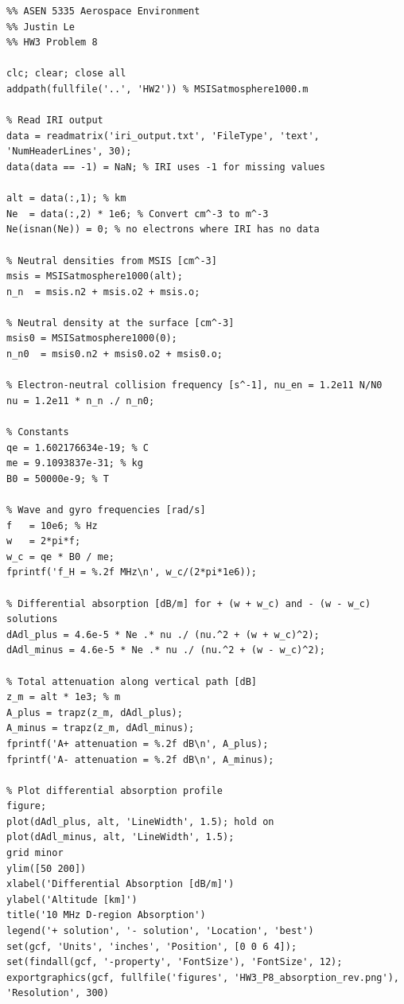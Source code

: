 \documentclass[11pt]{article}
\begin{document}
\newpage
\begin{lstlisting}
%% ASEN 5335 Aerospace Environment
%% Justin Le
%% HW3 Problem 8

clc; clear; close all
addpath(fullfile('..', 'HW2')) % MSISatmosphere1000.m

% Read IRI output
data = readmatrix('iri_output.txt', 'FileType', 'text', 'NumHeaderLines', 30);
data(data == -1) = NaN; % IRI uses -1 for missing values

alt = data(:,1); % km
Ne  = data(:,2) * 1e6; % Convert cm^-3 to m^-3
Ne(isnan(Ne)) = 0; % no electrons where IRI has no data

% Neutral densities from MSIS [cm^-3]
msis = MSISatmosphere1000(alt);
n_n  = msis.n2 + msis.o2 + msis.o;

% Neutral density at the surface [cm^-3]
msis0 = MSISatmosphere1000(0);
n_n0  = msis0.n2 + msis0.o2 + msis0.o;

% Electron-neutral collision frequency [s^-1], nu_en = 1.2e11 N/N0
nu = 1.2e11 * n_n ./ n_n0;

% Constants
qe = 1.602176634e-19; % C
me = 9.1093837e-31; % kg
B0 = 50000e-9; % T

% Wave and gyro frequencies [rad/s]
f   = 10e6; % Hz
w   = 2*pi*f;
w_c = qe * B0 / me;
fprintf('f_H = %.2f MHz\n', w_c/(2*pi*1e6));

% Differential absorption [dB/m] for + (w + w_c) and - (w - w_c) solutions
dAdl_plus = 4.6e-5 * Ne .* nu ./ (nu.^2 + (w + w_c)^2);
dAdl_minus = 4.6e-5 * Ne .* nu ./ (nu.^2 + (w - w_c)^2);

% Total attenuation along vertical path [dB]
z_m = alt * 1e3; % m
A_plus = trapz(z_m, dAdl_plus);
A_minus = trapz(z_m, dAdl_minus);
fprintf('A+ attenuation = %.2f dB\n', A_plus);
fprintf('A- attenuation = %.2f dB\n', A_minus);

% Plot differential absorption profile
figure;
plot(dAdl_plus, alt, 'LineWidth', 1.5); hold on
plot(dAdl_minus, alt, 'LineWidth', 1.5);
grid minor
ylim([50 200])
xlabel('Differential Absorption [dB/m]')
ylabel('Altitude [km]')
title('10 MHz D-region Absorption')
legend('+ solution', '- solution', 'Location', 'best')
set(gcf, 'Units', 'inches', 'Position', [0 0 6 4]);
set(findall(gcf, '-property', 'FontSize'), 'FontSize', 12);
exportgraphics(gcf, fullfile('figures', 'HW3_P8_absorption_rev.png'), 'Resolution', 300)
\end{lstlisting}
\end{document}
